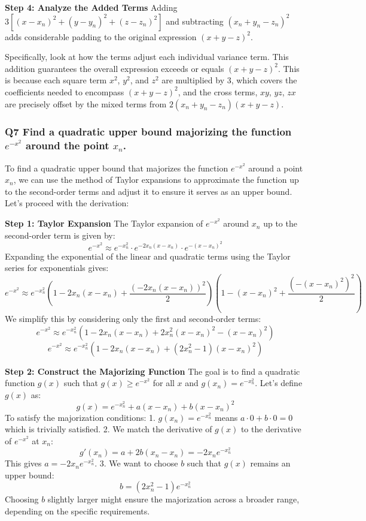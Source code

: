 \documentclass[8pt]{article}
\begin{document}
{\textbf{Step 4: Analyze the Added Terms}
Adding \(3[(x - x_n)^2 + (y - y_n)^2 + (z - z_n)^2]\) and subtracting \((x_n + y_n - z_n)^2\) adds considerable padding to the original expression \((x + y - z)^2\). 

Specifically, look at how the terms adjust each individual variance term. This addition guarantees the overall expression exceeds or equals \((x + y - z)^2\). This is because each square term \(x^2\), \(y^2\), and \(z^2\) are multiplied by 3, which covers the coefficients needed to encompass \((x + y - z)^2\), and the cross terms, \(xy\), \(yz\), \(zx\) are precisely offset by the mixed terms from \(2(x_n + y_n - z_n)(x + y - z)\).


\subsubsection*{Q7 Find a quadratic upper bound majorizing the function \( e^{-x^2} \) around the point \( x_n \).}

To find a quadratic upper bound that majorizes the function \( e^{-x^2} \) around a point \( x_n \), we can use the method of Taylor expansions to approximate the function up to the second-order terms and adjust it to ensure it serves as an upper bound. Let's proceed with the derivation:

\textbf{Step 1: Taylor Expansion}
The Taylor expansion of \( e^{-x^2} \) around \( x_n \) up to the second-order term is given by:
\[
e^{-x^2} \approx e^{-x_n^2} \cdot e^{-2x_n(x-x_n)} \cdot e^{-(x-x_n)^2}
\]
Expanding the exponential of the linear and quadratic terms using the Taylor series for exponentials gives:
\[
e^{-x^2} \approx e^{-x_n^2} \left(1 - 2x_n(x-x_n) + \frac{(-2x_n(x-x_n))^2}{2}\right) \left(1 - (x-x_n)^2 + \frac{(-(x-x_n)^2)^2}{2}\right)
\]
We simplify this by considering only the first and second-order terms:
\[
e^{-x^2} \approx e^{-x_n^2} \left(1 - 2x_n(x-x_n) + 2x_n^2(x-x_n)^2 - (x-x_n)^2\right)
\]
\[
e^{-x^2} \approx e^{-x_n^2} \left(1 - 2x_n(x-x_n) + (2x_n^2 - 1)(x-x_n)^2\right)
\]

\textbf{Step 2: Construct the Majorizing Function}
The goal is to find a quadratic function \( g(x) \) such that \( g(x) \geq e^{-x^2} \) for all \( x \) and \( g(x_n) = e^{-x_n^2} \). Let's define \( g(x) \) as:
\[
g(x) = e^{-x_n^2} + a(x-x_n) + b(x-x_n)^2
\]
To satisfy the majorization conditions:
1. \( g(x_n) = e^{-x_n^2} \) means \( a \cdot 0 + b \cdot 0 = 0 \) which is trivially satisfied.
2. We match the derivative of \( g(x) \) to the derivative of \( e^{-x^2} \) at \( x_n \):
   \[
   g'(x_n) = a + 2b(x_n-x_n) = -2x_n e^{-x_n^2}
   \]
   This gives \( a = -2x_n e^{-x_n^2} \).
3. We want to choose \( b \) such that \( g(x) \) remains an upper bound:
   \[
   b = (2x_n^2 - 1) e^{-x_n^2}
   \]
   Choosing \( b \) slightly larger might ensure the majorization across a broader range, depending on the specific requirements.

}
\end{document}
